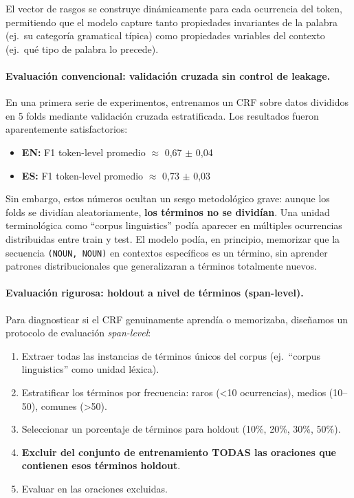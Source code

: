 El vector de rasgos se construye dinámicamente para cada ocurrencia del token, permitiendo que el modelo capture tanto propiedades invariantes de la palabra (ej.\ su categoría gramatical típica) como propiedades variables del contexto (ej.\ qué tipo de palabra lo precede).

\paragraph{Evaluación convencional: validación cruzada sin control de leakage.}
En una primera serie de experimentos, entrenamos un CRF sobre datos divididos en 5 folds mediante validación cruzada estratificada. Los resultados fueron aparentemente satisfactorios:

\begin{itemize}
    \item \textbf{EN:} F1 token-level promedio $\approx$ 0{,}67 $\pm$ 0{,}04
    \item \textbf{ES:} F1 token-level promedio $\approx$ 0{,}73 $\pm$ 0{,}03
\end{itemize}

Sin embargo, estos números ocultan un sesgo metodológico grave: aunque los folds se dividían aleatoriamente, \textbf{los términos no se dividían}. Una unidad terminológica como ``corpus linguistics'' podía aparecer en múltiples ocurrencias distribuidas entre train y test. El modelo podía, en principio, memorizar que la secuencia \texttt{(NOUN, NOUN)} en contextos específicos es un término, sin aprender patrones distribucionales que generalizaran a términos totalmente nuevos.

\paragraph{Evaluación rigurosa: holdout a nivel de términos (span-level).}
Para diagnosticar si el CRF genuinamente aprendía o memorizaba, diseñamos un protocolo de evaluación \emph{span-level}:

\begin{enumerate}
    \item Extraer todas las instancias de términos únicos del corpus (ej.\ ``corpus linguistics'' como unidad léxica).
    \item Estratificar los términos por frecuencia: raros (<10 ocurrencias), medios (10--50), comunes (>50).
    \item Seleccionar un porcentaje de términos para holdout (10\%, 20\%, 30\%, 50\%).
    \item \textbf{Excluir del conjunto de entrenamiento TODAS las oraciones que contienen esos términos holdout}.
    \item Evaluar en las oraciones excluidas.
\end{enumerate}

